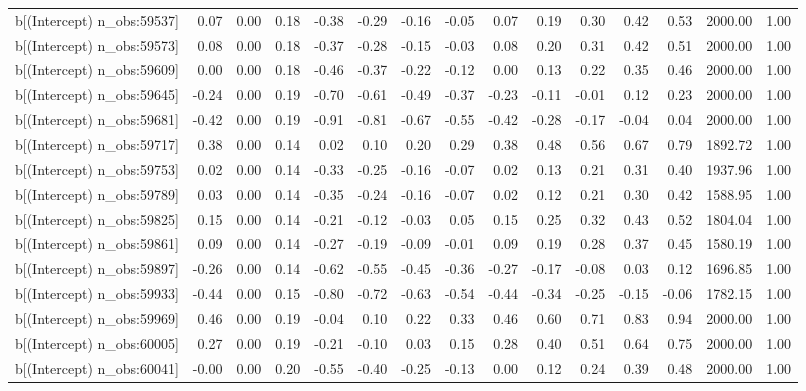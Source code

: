 \begin{table}[ht]
\begin{tabular}{rrrrrrrrrrrrrrr}
  b[(Intercept) n\_obs:59537] & 0.07 & 0.00 & 0.18 & -0.38 & -0.29 & -0.16 & -0.05 & 0.07 & 0.19 & 0.30 & 0.42 & 0.53 & 2000.00 & 1.00 \\ 
  b[(Intercept) n\_obs:59573] & 0.08 & 0.00 & 0.18 & -0.37 & -0.28 & -0.15 & -0.03 & 0.08 & 0.20 & 0.31 & 0.42 & 0.51 & 2000.00 & 1.00 \\ 
  b[(Intercept) n\_obs:59609] & 0.00 & 0.00 & 0.18 & -0.46 & -0.37 & -0.22 & -0.12 & 0.00 & 0.13 & 0.22 & 0.35 & 0.46 & 2000.00 & 1.00 \\ 
  b[(Intercept) n\_obs:59645] & -0.24 & 0.00 & 0.19 & -0.70 & -0.61 & -0.49 & -0.37 & -0.23 & -0.11 & -0.01 & 0.12 & 0.23 & 2000.00 & 1.00 \\ 
  b[(Intercept) n\_obs:59681] & -0.42 & 0.00 & 0.19 & -0.91 & -0.81 & -0.67 & -0.55 & -0.42 & -0.28 & -0.17 & -0.04 & 0.04 & 2000.00 & 1.00 \\ 
  b[(Intercept) n\_obs:59717] & 0.38 & 0.00 & 0.14 & 0.02 & 0.10 & 0.20 & 0.29 & 0.38 & 0.48 & 0.56 & 0.67 & 0.79 & 1892.72 & 1.00 \\ 
  b[(Intercept) n\_obs:59753] & 0.02 & 0.00 & 0.14 & -0.33 & -0.25 & -0.16 & -0.07 & 0.02 & 0.13 & 0.21 & 0.31 & 0.40 & 1937.96 & 1.00 \\ 
  b[(Intercept) n\_obs:59789] & 0.03 & 0.00 & 0.14 & -0.35 & -0.24 & -0.16 & -0.07 & 0.02 & 0.12 & 0.21 & 0.30 & 0.42 & 1588.95 & 1.00 \\ 
  b[(Intercept) n\_obs:59825] & 0.15 & 0.00 & 0.14 & -0.21 & -0.12 & -0.03 & 0.05 & 0.15 & 0.25 & 0.32 & 0.43 & 0.52 & 1804.04 & 1.00 \\ 
  b[(Intercept) n\_obs:59861] & 0.09 & 0.00 & 0.14 & -0.27 & -0.19 & -0.09 & -0.01 & 0.09 & 0.19 & 0.28 & 0.37 & 0.45 & 1580.19 & 1.00 \\ 
  b[(Intercept) n\_obs:59897] & -0.26 & 0.00 & 0.14 & -0.62 & -0.55 & -0.45 & -0.36 & -0.27 & -0.17 & -0.08 & 0.03 & 0.12 & 1696.85 & 1.00 \\ 
  b[(Intercept) n\_obs:59933] & -0.44 & 0.00 & 0.15 & -0.80 & -0.72 & -0.63 & -0.54 & -0.44 & -0.34 & -0.25 & -0.15 & -0.06 & 1782.15 & 1.00 \\ 
  b[(Intercept) n\_obs:59969] & 0.46 & 0.00 & 0.19 & -0.04 & 0.10 & 0.22 & 0.33 & 0.46 & 0.60 & 0.71 & 0.83 & 0.94 & 2000.00 & 1.00 \\ 
  b[(Intercept) n\_obs:60005] & 0.27 & 0.00 & 0.19 & -0.21 & -0.10 & 0.03 & 0.15 & 0.28 & 0.40 & 0.51 & 0.64 & 0.75 & 2000.00 & 1.00 \\ 
  b[(Intercept) n\_obs:60041] & -0.00 & 0.00 & 0.20 & -0.55 & -0.40 & -0.25 & -0.13 & 0.00 & 0.12 & 0.24 & 0.39 & 0.48 & 2000.00 & 1.00 \\ 

\end{tabular}
\end{table}
